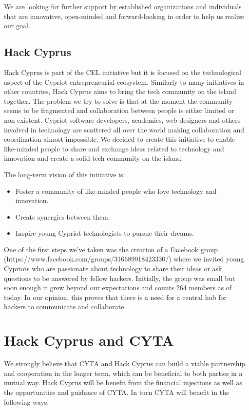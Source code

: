 \documentclass[a4paper,11pt]{report}
\begin{document}
We are looking for further support by established organizations and individuals that are innovative, open-minded and forward-looking in order to help us realize our goal.

\section{Hack Cyprus}
Hack Cyprus is part of the CEL initiative but it is focused on the technological aspect of the Cypriot entrepreneurial ecosystem. Similarly to many initiatives in other countries, Hack Cyprus aims to bring the tech community on the island together. The problem we try to solve is that at the moment the community seems to be fragmented and collaboration between people is either limited or non-existent. Cypriot software developers, academics, web designers and others involved in technology are scattered all over the world making collaboration and coordination almost impossible. We decided to create this initiative to enable like-minded people to share and exchange ideas related to technology and innovation and create a solid tech community on the island. 

The long-term vision of this initiative is:
\begin{itemize}
  \item Foster a community of like-minded people who love technology and innovation.
  \item Create synergies between them.
  \item Inspire young Cypriot technologists to pursue their dreams.  
\end{itemize}

One of the first steps we've taken was the creation of a Facebook group (https://www.facebook.com/groups/316689918423330/) where we invited young Cypriots who are passionate about technology to share their ideas or ask questions to be answered by fellow hackers. Initially, the group was small but soon enough it grew beyond our expectations and counts 264 members as of today. In our opinion, this proves that there is a need for a central hub for hackers to communicate and collaborate.

\chapter{Hack Cyprus and CYTA}
We strongly believe that CYTA and Hack Cyprus can build a viable partnership and cooperation in the longer term, which can be beneficial to both parties in a mutual way. Hack Cyprus will be benefit from the financial injections as well as the opportunities and guidance of CYTA. In turn CYTA will benefit in the following ways:
\end{document}
